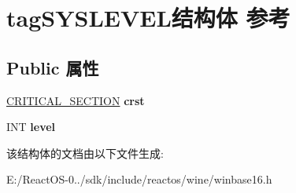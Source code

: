 \hypertarget{structtag_s_y_s_l_e_v_e_l}{}\section{tag\+S\+Y\+S\+L\+E\+V\+E\+L结构体 参考}
\label{structtag_s_y_s_l_e_v_e_l}
\subsection*{Public 属性}
\begin{DoxyCompactItemize}
\item 
\mbox{\label{structtag_s_y_s_l_e_v_e_l_a46bc81ed4f4b51374aa3df2c5c151e7f}} 
\hyperlink{struct___c_r_i_t_i_c_a_l___s_e_c_t_i_o_n}{C\+R\+I\+T\+I\+C\+A\+L\+\_\+\+S\+E\+C\+T\+I\+ON} {\bfseries crst}
\item 
\mbox{\label{structtag_s_y_s_l_e_v_e_l_ab10a94d1c290b5092a8be2ecdcab4e91}} 
I\+NT {\bfseries level}
\end{DoxyCompactItemize}


该结构体的文档由以下文件生成\+:\begin{DoxyCompactItemize}
\item 
E\+:/\+React\+O\+S-\/0../sdk/include/reactos/wine/winbase16.\+h\end{DoxyCompactItemize}
